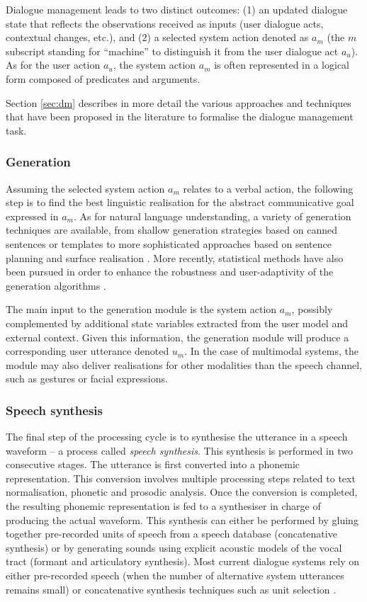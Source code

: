 Dialogue management leads to two distinct outcomes: (1) an updated dialogue state that reflects the observations received as inputs (user dialogue acts, contextual changes, etc.), and (2) a selected system action denoted as $a_m$ (the $m$ subscript standing for ``machine'' to distinguish it from the user dialogue act $a_u$).  As for the user action $a_u$, the system action $a_m$ is often represented in a logical form composed of predicates and arguments. 

Section \ref{sec:dm} describes in more detail the various approaches and techniques that have been proposed in the literature to formalise the dialogue management task. 

\subsubsection*{Generation}
Assuming the selected system action $a_m$ relates to a verbal action, the following step is to find the best linguistic realisation for the abstract communicative goal expressed in $a_m$.  As for natural language understanding, a variety of generation techniques are available, from shallow generation strategies based on canned sentences or templates to more sophisticated approaches based on sentence planning and surface realisation \citep{Stone2003,koller-stone:2007}.  More recently, statistical methods have also been pursued in order to enhance the robustness and user-adaptivity of the generation algorithms \citep{Rieser:2010,DethlefsC11}. 

The main input to the generation module is the system action $a_m$, possibly complemented by additional state variables extracted from the user model and external context. Given this information, the generation module will produce a corresponding user utterance denoted $u_m$.  In the case of multimodal systems, the module may also deliver realisations for other modalities than the speech channel, such as gestures or facial expressions.

\subsubsection*{Speech synthesis}
The final step of the processing cycle is to synthesise the utterance in a speech waveform --  a process called \textit{speech synthesis}.  This synthesis is performed in two consecutive stages.  The utterance is first converted into a phonemic representation. This conversion involves multiple processing steps related to text normalisation, phonetic and prosodic analysis.  Once the conversion is completed, the resulting phonemic representation is fed to a synthesiser in charge of producing the actual waveform. This synthesis can either be performed by gluing together pre-recorded units of speech from a speech database (concatenative synthesis) or by generating sounds using explicit acoustic models of the vocal tract (formant and articulatory synthesis). Most current dialogue systems rely on either pre-recorded speech (when the number of alternative system utterances remains small) or concatenative synthesis techniques such as unit selection \citep{hunt1996}.

